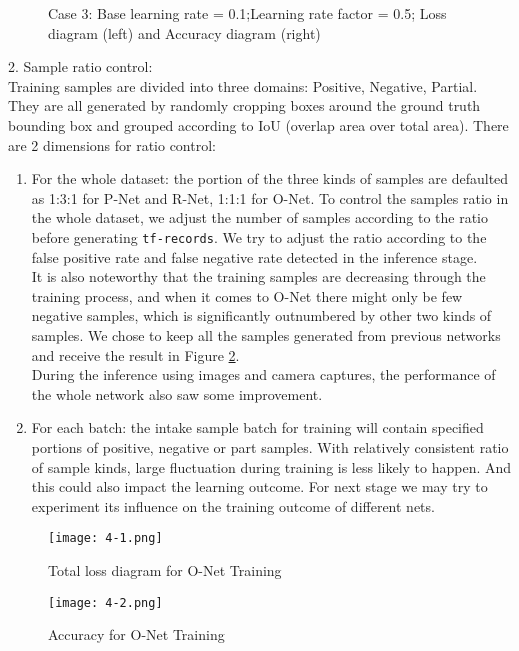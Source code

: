 \begin{figure}
    \centering
      \qquad
      \label{Figure.3-3}
      \caption{Case 3: Base learning rate = 0.1;Learning rate factor = 0.5; Loss diagram (left) and Accuracy diagram (right)}
\end{figure}
2.	Sample ratio control:\\[.2in]
Training samples are divided into three domains: Positive, Negative, Partial. They are all generated by randomly cropping boxes around the ground truth bounding box and grouped according to IoU (overlap area over total area). There are 2 dimensions for ratio control:
\begin{enumerate}
    \item For the whole dataset: the portion of the three kinds of samples are defaulted as 1:3:1 for P-Net and R-Net, 1:1:1 for O-Net. To control the samples ratio in the whole dataset, we adjust the number of samples according to the ratio before generating \verb#tf-records#. We try to adjust the ratio according to the false positive rate and false negative rate detected in the inference stage. \\[.2in] It is also noteworthy that the training samples are decreasing through the training process, and when it comes to O-Net there might only be few negative samples, which is significantly outnumbered by other two kinds of samples. We chose to keep all the samples generated from previous networks and receive the result in Figure \ref{Fig.4-4}.\\[.2in] During the inference using images and camera captures, the performance of the whole network also saw some improvement. 
    \item For each batch: the intake sample batch for training will contain specified portions of positive, negative or part samples. With relatively consistent ratio of sample kinds, large fluctuation during training is less likely to happen. And this could also impact the learning outcome. For next stage we may try to experiment its influence on the training outcome of different nets.
\end{enumerate}

\begin{figure}
\centering
\texttt{[image: 4-1.png]}
\caption{Total loss diagram for O-Net Training} 
\vspace{.4in}
\texttt{[image: 4-2.png]}
\caption{Accuracy for O-Net Training} 
\label{Fig.4-4}
\end{figure}

